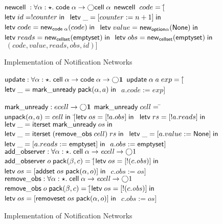 \begin{figure}
\begin{specification}
$\mathsf{newcell}\; : \forall \alpha:\star.\; \mathsf{code}\;{\alpha} \to \bigcirc{\mathsf{cell}\;{\alpha}}$ \nextline
$\mathsf{newcell}\;\;code = [$\=$\mathsf{letv}\;id = !counter\;\mathsf{in}\;$ \nextline
                                   \>$\mathsf{letv}\;\_ = [counter := n + 1]\;\mathsf{in}\;$ \nextline
                                   \>$\mathsf{letv}\;code = \mathsf{new}_{\mathsf{code}\;{\alpha}}(code)\;\mathsf{in}\;$ \nextline
                                   \>$\mathsf{letv}\;value = \mathsf{new}_{\mathsf{option }{\alpha}}(\mathsf{None})\;\mathsf{in}\;$ \nextline
                                   \>$\mathsf{letv}\;reads = \mathsf{new}_{\mathsf{cellset}}(\mathsf{emptyset})\;\mathsf{in}\;$ \nextline
                                   \>$\mathsf{letv}\;obs = \mathsf{new}_{\mathsf{cellset}}(\mathsf{emptyset})\;\mathsf{in}\;$ \nextline
                                   \>$\; (code, value, reads, obs, id)]$ 
\end{specification}
\caption{Implementation of Notification Networks}
\label{notification-implementation}
\end{figure}

\begin{figure}
\mbox{}
\begin{specification}
\nextline
$\mathsf{update} : \forall \alpha:\star.\; \mathsf{cell}\;{\alpha} \to \mathsf{code}\;{\alpha} \to \bigcirc{\mathbf{1}}$\nextline
$\mathsf{update}\;\alpha\;a\;exp = 
     [$\=$\mathsf{letv}\;\_ = \mathsf{mark\_unready}\;\mathsf{pack}({\alpha}, {a})\;\mathsf{in}\;$ \nextline
       \>$a.code := exp]$ \nextline[1em]

$\mathsf{mark\_unready} : ecell \to \bigcirc{\mathbf{1}}$ \nextline
$\mathsf{mark\_unready}\;cell =\; $\=$\mathsf{unpack}(\alpha, a) = cell\; \mathsf{in}$\nextline
\>  $[$\=$\mathsf{letv}\;os = [!a.obs]\;\mathsf{in}\;$ \nextline
\>     \>$\mathsf{letv}\;rs = [!a.reads]\;\mathsf{in}\;$ \nextline
\>     \>$\mathsf{letv}\;\_ = \mathsf{iterset}\;\mathsf{mark\_unready}\;os\;\mathsf{in}\;$ \nextline
\>     \>$\mathsf{letv}\;\_ = \mathsf{iterset}\;(\mathsf{remove\_obs}\;cell)\;rs\;\mathsf{in}\;$ \nextline
\>     \>$\mathsf{letv}\;\_ = [a.value := \mathsf{None}]\;\mathsf{in}\;$ \nextline
\>     \>$\mathsf{letv}\;\_ = [a.reads := \mathsf{emptyset}]\;\mathsf{in}\;$ \nextline
\>     \>$a.obs   := \mathsf{emptyset}]$ 
\nextline[1em]
$\mathsf{add\_observer} : \forall \alpha:\star.\; \mathsf{cell}\;{\alpha} \to \mathit{ecell} \to \bigcirc{1}$ \nextline
$\mathsf{add\_observer} \;o \;\mathsf{pack}({\beta}, {c}) = [$\=$\mathsf{letv}\;os = [!(c.\mathit{obs})]\;\mathsf{in}\;$ \nextline
                                             \>$\mathsf{letv}\;os = [\mathsf{addset}\;os\;\mathsf{pack}({\alpha}, {o})]\;\mathsf{in}\;$ \nextline
                                             \>$c.\mathit{obs} := os]$
\nextline[1em]
$\mathsf{remove\_obs} : \forall \alpha:\star.\; \mathsf{cell}\;{\alpha} \to \mathit{ecell} \to \bigcirc{1}$ \nextline
$\mathsf{remove\_obs} \;o \;\mathsf{pack}({\beta}, {c}) = [$\=$\mathsf{letv}\;os = [!(c.\mathit{obs})]\;\mathsf{in}\;$ \nextline
                                             \>$\mathsf{letv}\;os = [\mathsf{removeset}\;os\;\mathsf{pack}({\alpha}, {o})]\;\mathsf{in}\;$ \nextline
                                             \>$c.\mathit{obs} := os]$

\end{specification}
\caption{Implementation of Notification Networks}
\label{notification-implementation-update}
\end{figure}

